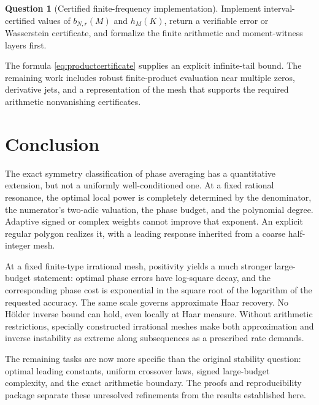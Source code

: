 \documentclass[11pt,a4paper]{article}
\numberwithin{equation}{section}
\theoremstyle{plain}
\theoremstyle{definition}
\newtheorem{question}[theorem]{Question}
\theoremstyle{remark}
\begin{document}
\begin{question}[Certified finite-frequency implementation]
Implement interval-certified values of $b_{N,r}(M)$ and $h_M(K)$, return a
verifiable error or Wasserstein certificate, and formalize the finite
arithmetic and moment-witness layers first.
\end{question}
The formula \eqref{eq:productcertificate} supplies an explicit infinite-tail
bound. The remaining work includes robust finite-product evaluation near
multiple zeros, derivative jets, and a representation of the mesh that
supports the required arithmetic nonvanishing certificates.

\section{Conclusion}

The exact symmetry classification of phase averaging has a quantitative
extension, but not a uniformly well-conditioned one. At a fixed rational
resonance, the optimal local power is completely determined by the denominator,
the numerator's two-adic valuation, the phase budget, and the polynomial
degree. Adaptive signed or complex weights cannot improve that exponent.
An explicit regular polygon realizes it, with a leading response inherited
from a coarse half-integer mesh.

At a fixed finite-type irrational mesh, positivity yields a much stronger
large-budget statement: optimal phase errors have log-square decay, and the
corresponding phase cost is exponential in the square root of the logarithm
of the requested accuracy. The same scale governs approximate Haar recovery.
No H\"older inverse bound can hold, even locally at Haar measure. Without
arithmetic restrictions, specially constructed irrational meshes make both
approximation and inverse instability as extreme along subsequences as a
prescribed rate demands.

The remaining tasks are now more specific than the original stability
question: optimal leading constants, uniform crossover laws, signed
large-budget complexity, and the exact arithmetic boundary. The proofs and
reproducibility package separate these unresolved refinements from the results
established here.
\end{document}
